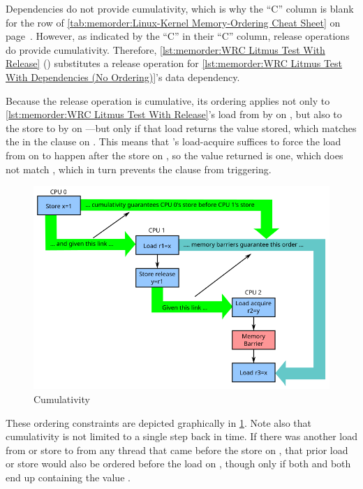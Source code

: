 Dependencies do not provide cumulativity,
which is why the ``C'' column is blank for the  row
of \cref{tab:memorder:Linux-Kernel Memory-Ordering Cheat Sheet}
on
page~\pageref{tab:memorder:Linux-Kernel Memory-Ordering Cheat Sheet}.
However, as indicated by the ``C'' in their ``C'' column,
release operations do provide cumulativity.
Therefore,
\cref{lst:memorder:WRC Litmus Test With Release}
()
substitutes a release operation for
\cref{lst:memorder:WRC Litmus Test With Dependencies (No Ordering)}'s
data dependency.
\begin{fcvref}
Because the release operation is cumulative, its ordering applies not only to
\cref{lst:memorder:WRC Litmus Test With Release}'s
load from  by  on , but also to the store to 
by  on ---but only if that load returns the value stored,
which matches the  in the  clause on .
This means that 's load-acquire suffices to force the
load from  on  to happen after the store on , so
the value returned is one, which does not match , which
in turn prevents the  clause from triggering.
\end{fcvref}

\begin{figure}
\centering
\includegraphics{memorder/memorybarriercum}
\caption{Cumulativity}
\label{fig:memorder:Cumulativity}
\end{figure}

\begin{fcvref}
These ordering constraints are depicted graphically in
\cref{fig:memorder:Cumulativity}.
Note also that cumulativity is not limited to a single step back in time.
If there was another load from  or store to  from any thread
that came before the store on , that prior load or store would also
be ordered before the load on , though only if both  and
 both end up containing the value .
\end{fcvref}


